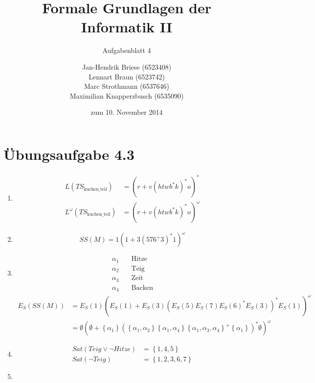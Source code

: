 \documentclass[a4paper]{scrartcl}
\title{Formale Grundlagen der Informatik II}
\subtitle{Aufgabenblatt 4}
\author{
    Jan-Hendrik Briese (6523408) \\
    Lennart Braun (6523742) \\
    Marc Strothmann (6537646) \\
    Maximilian Knapperzbusch (6535090)
}
\date{zum 10. November 2014}
\begin{document}
\maketitle

\section*{Übungsaufgabe 4.3} 
\begin{enumerate}
    \item
        \begin{align*}
            L(TS_\text{kuchen\_teil}) &= \left( r + v \left( htwb^*k \right)^* o \right)^* \\
            L^\omega(TS_\text{kuchen\_teil}) &= \left( r + v \left( htwb^*k \right)^* o \right)^\omega
        \end{align*}

    \item
        \begin{equation*}
            SS(M) = 1 \left( 1 + 3 \left( 576^+3 \right)^* 1 \right)^\omega
        \end{equation*}

    \item
        \begin{align*}
            \alpha_1 &\quad \text{Hitze} \\
            \alpha_2 &\quad \text{Teig} \\
            \alpha_3 &\quad \text{Zeit} \\
            \alpha_4 &\quad \text{Backen}
        \end{align*}
        \begin{equation*}
            \begin{split}
                E_S(SS(M)) &= E_S(1) \left( E_S(1) + E_S(3) \left( E_S(5) E_S(7) E_S(6)^* E_S(3) \right)^* E_S(1) \right)^\omega \\
                &= \emptyset \left( \emptyset + \left\{ \alpha_1 \right\} \left( \left\{ \alpha_1, \alpha_2 \right\} \left\{ \alpha_1, \alpha_4 \right\} \left\{ \alpha_1, \alpha_3, \alpha_4 \right\}^+ \left\{ \alpha_1 \right\} \right)^* \emptyset \right)^\omega
            \end{split}
        \end{equation*}

    \item
        \begin{align}
            Sat(Teig \lor \lnot Hitze) &= \left\{ 1, 4, 5 \right\} \\
            Sat(\lnot Teig) &= \left\{ 1, 2, 3, 6, 7 \right\}
        \end{align}
        

    \item

\end{enumerate}
\end{document}
